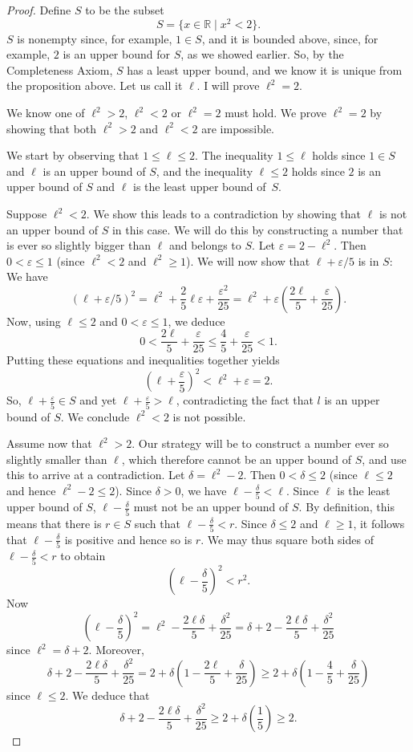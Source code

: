 \documentclass[12pt]{amsart}
\def\d{\delta}
\def\e{\varepsilon}
\newcommand{\R}{{\mathbb{R}}}
\numberwithin{equation}{section}
\theoremstyle{plain} %
\theoremstyle{definition}
\theoremstyle{remark}
\begin{document}
\begin{proof} 
Define $S$ to be the subset 
$$
S = \{x \in \R \mid x^2 < 2\}.
$$
$S$ is nonempty since, for example, $1 \in S$, and it is bounded above, since, for example, 
$2$ is an upper bound for $S$, as we showed earlier.  So, by the Completeness Axiom, $S$ has a least upper bound, and we know it is unique from
  the proposition above. Let us call it $\ell$. I will prove $\ell^2 = 2$. 


We know one of $\ell^2 > 2$, $\ell^2 < 2$ or $\ell^2 = 2$ must hold. We prove $\ell^2 = 2$ by showing that both
$\ell^2 > 2$ and $\ell^2 < 2$ are impossible.

We start by observing that $1 \leq \ell \leq 2$. The inequality $1 \leq \ell$ holds since $1 \in S$ and $\ell$ is an upper bound of $S$, 
and the inequality $\ell \leq 2$ holds  since $2$ is an upper bound of $S$ and $\ell$ is the least upper bound of~$S$.



Suppose $\ell^2 < 2$. We show this leads to a contradiction by showing that $\ell$ is not an upper bound of $S$ in this case. We will do this by constructing a number
that is ever so slightly bigger than $\ell$ and  belongs to $S$. 
Let $\e = 2 - \ell^2$. Then $0 < \e \leq 1$ (since $\ell^2 < 2$ and $\ell^2 \geq 1$).  
We will now show that $\ell + \e/5$ is in $S$: We have
$$
(\ell + \e/5)^2 = \ell^2 + \frac25 \ell\e + \frac{\e^2}{25} = \ell^2 + \e(\frac{2\ell}{5} + \frac{\e}{25}).
$$
Now, using $\ell \leq 2$ and $0 < \e \leq 1$, we deduce
$$
0 < \frac{2\ell}{5} + \frac{\e}{25} \leq \frac45 + \frac{\e}{25} < 1.
$$
Putting these equations and inequalities  together yields
$$
(\ell + \frac{\e}{5})^2 < \ell^2 + \e = 2.
$$
So, $\ell + \frac{\e}{5} \in S$ and yet $\ell + \frac{\e}{5} > \ell$, contradicting the fact that $l$ is an upper bound of $S$. We conclude $\ell^2 < 2$ is not
possible.

Assume now that $\ell^2 > 2$. Our strategy will be to construct a number ever so slightly smaller than $\ell$, which therefore cannot be an upper bound of $S$, and use this to
arrive at a contradiction. 
Let $\d = \ell^2 - 2$. Then $0 < \d \leq 2$ (since $\ell \leq 2$ and hence $\ell^2 - 2 \leq 2$).
Since $\d > 0$, we have $\ell - \frac{\d}{5} < \ell$. Since $\ell$ is the least upper bound of $S$, $\ell- \frac{\d}{5}$ must not be an upper bound of $S$. By definition, this means that there is $r \in S$ such that 
$\ell - \frac{\d}{5} < r$. Since $\d \leq 2$ and $\ell \geq 1$, it follows that $\ell - \frac{\d}{5}$ is positive and hence so is $r$. We may thus square both sides of 
$\ell - \frac{\d}{5} < r$ to obtain
$$
(\ell - \frac{\d}{5})^2 < r^2.
$$
Now
$$
(\ell - \frac{\d}{5})^2 = \ell^2 - \frac{2\ell\d}{5} + \frac{\d^2}{25} = \d + 2 - \frac{2\ell\d}{5} + \frac{\d^2}{25}
$$
since $\ell^2 = \d + 2$.
Moreover, 
$$
\d + 2 - \frac{2\ell\d}{5} + \frac{\d^2}{25}
= 2 + \d(1 - \frac{2\ell}{5} + \frac{\d}{25})
\geq 2 + \d(1 - \frac{4}{5} + \frac{\d}{25})
$$
since $\ell \leq 2$. We deduce that 
$$
\d + 2 - \frac{2\ell\d}{5} + \frac{\d^2}{25}
\geq 2 + \d(\frac{1}{5}) \geq 2. 
$$


\end{proof}
\end{document}
